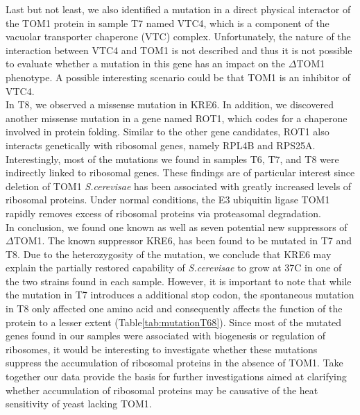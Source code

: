 \documentclass[10pt,a4paper]{article}
\begin{document}
\noindent Last but not least, we also identified a mutation in a direct physical interactor of the TOM1 protein in sample T7 named VTC4, which is a component of the vacuolar transporter chaperone (VTC) complex\cite{muller_role_2003}. Unfortunately, the nature of the interaction between VTC4 and TOM1 is not described and thus it is not possible to evaluate whether a mutation in this gene has an impact on the $\Delta$TOM1 phenotype. A possible interesting scenario could be that TOM1 is an inhibitor of VTC4.\\
 
\noindent In T8, we observed a missense mutation in KRE6. In addition, we discovered another missense mutation in a gene named ROT1, which codes for a chaperone involved in protein folding\cite{takeuchi_saccharomyces_2008}. Similar to the other gene candidates, ROT1 also interacts genetically with ribosomal genes, namely RPL4B and RPS25A.\\
 
\noindent Interestingly, most of the mutations we found in samples T6, T7, and T8 were indirectly linked to ribosomal genes. These findings are of particular interest since deletion of TOM1 \textit{S.cerevisae} has been associated with greatly increased levels of ribosomal proteins. Under normal conditions, the E3 ubiquitin ligase TOM1 rapidly removes excess of ribosomal proteins via proteasomal degradation\cite{sung_conserved_2016}.\\
 

\noindent In conclusion, we found one known as well as seven potential new suppressors of $\Delta$TOM1. The known suppressor KRE6, has been found to be mutated in T7 and T8. Due to the heterozygosity of the mutation, we conclude that KRE6 may explain the partially restored capability of \textit{S.cerevisae} to grow at 37\degree C in one of the two strains found in each sample. However, it is important to note that while the mutation in T7 introduces a additional stop codon, the spontaneous mutation in T8 only affected one amino acid and consequently affects the function of the protein to a lesser extent (Table\ref{tab:mutationT68})\cite{sasaki_extragenic_2000}. Since most of the mutated genes found in our samples were associated with biogenesis or regulation of ribosomes, it would be interesting to investigate whether these mutations suppress the accumulation of ribosomal proteins in the absence of TOM1. Take together our data provide the basis for further investigations aimed at clarifying whether accumulation of ribosomal proteins may be causative of the heat sensitivity of yeast lacking TOM1.
 
\end{document}

